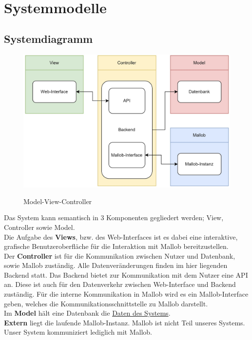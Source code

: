 \section{Systemmodelle}

\subsection{Systemdiagramm}

\begin{figure}[H]
    \centering
    \includegraphics[width=\textwidth]{images-interface/Diagramme/Systemdiagramm3.jpg} \\
    \caption{\gls{Model-View-Controller}}
\end{figure}
Das System kann semantisch in 3 Komponenten gegliedert werden; View, Controller sowie Model. \\
Die Aufgabe des \textbf{Views}, bzw. des Web-Interfaces ist es dabei eine interaktive, grafische Benutzeroberfläche für die Interaktion mit \gls{Mallob} bereitzustellen. \\
Der \textbf{Controller} ist für die Kommunikation zwischen \gls{Nutzer} und \gls{Datenbank}, sowie \gls{Mallob} zuständig. Alle Datenveränderungen finden im hier liegenden Backend statt. Das Backend bietet zur Kommunikation mit dem Nutzer eine \gls{API} an. Diese ist auch für den Datenverkehr zwischen \gls{Web-Interface} und Backend zuständig. Für die interne Kommunikation in \gls{Mallob} wird es ein \gls{Mallob}-Interface geben, welches die Kommunikationsschnittstelle zu \gls{Mallob} darstellt.\\
Im \textbf{Model} hält eine \gls{Datenbank} die \hyperref[PD]{Daten des Systems}. \\
\textbf{Extern} liegt die laufende \gls{Mallob}-Instanz. \gls{Mallob} ist nicht Teil unseres Systems. Unser System kommuniziert lediglich mit \gls{Mallob}.

